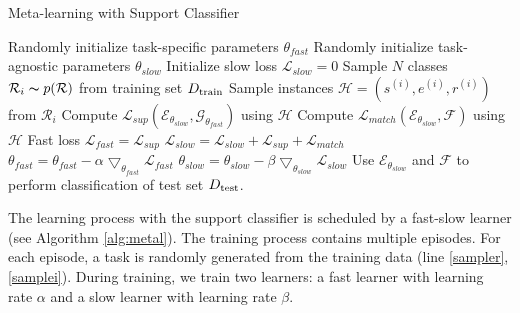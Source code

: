 \begin{algorithm}[th]
\small
\caption{Meta-learning with Support Classifier}
\label{alg:metal}
\begin{algorithmic}[1]
\STATE Randomly initialize task-specific parameters $\theta_{fast}$
\STATE Randomly initialize task-agnostic parameters $\theta_{slow}$
\STATE Initialize slow loss $\mathcal{L}_{slow}=0$
\STATE Sample $N$ classes $\mathcal{R}_i \thicksim p(\mathcal{R})$ from training set $D_{\rm{train}}$
\label{sampler}
\STATE Sample instances $\mathcal{H}=(s^{(i)}, e^{(i)}, r^{(i)})$ from $\mathcal{R}_i$
\label{samplei}
\STATE Compute $\mathcal{L}_{sup}(\mathcal{E}_{\theta_{slow}}, \mathcal{G}_{\theta_{fast}})$ using $\mathcal{H}$
\label{Lsup}
\STATE Compute $\mathcal{L}_{match}(\mathcal{E}_{\theta_{slow}}, \mathcal{F})$ using $\mathcal{H}$
\STATE Fast loss $\mathcal{L}_{fast}=\mathcal{L}_{sup}$
\label{fastloss}
\STATE $\mathcal{L}_{slow} = \mathcal{L}_{slow} + \mathcal{L}_{sup} + \mathcal{L}_{match}$
\label{slowloss}
\STATE $\theta_{fast} = \theta_{fast} - \alpha \bigtriangledown_{\theta_{fast}} \mathcal{L}_{fast}$
\label{fast}
\ENDFOR
\STATE $\theta_{slow} = \theta_{slow} - \beta \bigtriangledown_{\theta_{slow}} \mathcal{L}_{slow}$
\label{slow}
\ENDWHILE
\STATE Use $\mathcal{E}_{\theta_{slow}}$ and $\mathcal{F}$ to perform classification of test set $D_{\rm{test}}$.
\label{test}
\end{algorithmic}
\end{algorithm}

The learning process with the support classifier is scheduled by a fast-slow learner (see Algorithm \ref{alg:metal}).
The training process contains multiple episodes. For each episode, a task is randomly generated from the training data (line \ref{sampler}, \ref{samplei}).
During training, we train two learners: a fast learner with learning rate $\alpha$ and a slow learner with learning rate $\beta$.

